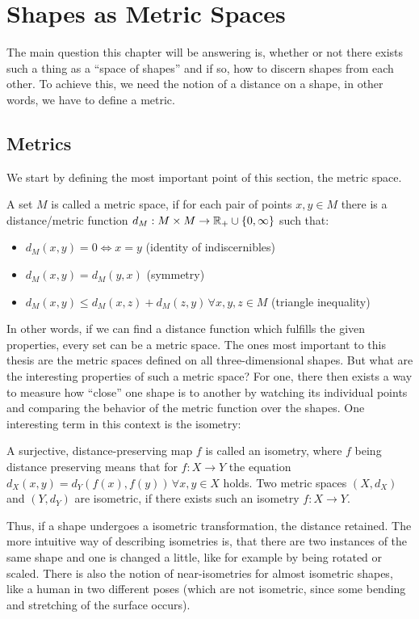 \chapter{Shapes as Metric Spaces}
\label{chapter:shapeSpaces}
The main question this chapter will be answering is, whether or not there exists such a thing as a ``space of shapes'' and if so, how to discern shapes from each other.
To achieve this, we need the notion of a distance on a shape, in other words, we have to define a metric.

\section{Metrics}
We start by defining the most important point of this section, the metric space.
\begin{mydef}
	A set $M$ is called a metric space, if for each pair of points $x,y \in M$ there is a distance/metric function $d_M: M \times M \rightarrow \mathbb{R}_+ \cup \{0,\infty\}$ such that:
	\begin{itemize}
		\item $d_M(x,y) = 0 \Leftrightarrow x = y$ (identity of indiscernibles)
		\item $d_M(x,y) = d_M(y,x)$ (symmetry)
		\item $d_M(x,y) \le d_M(x,z) + d_M(z,y)\,\forall x,y,z \in M$ (triangle inequality)
	\end{itemize}
\end{mydef}
In other words, if we can find a distance function which fulfills the given properties, every set can be a metric space.
The ones most important to this thesis are the metric spaces defined on all three-dimensional shapes.
But what are the interesting properties of such a metric space?
For one, there then exists a way to measure how ``close'' one shape is to another by watching its individual points and comparing the behavior of the metric function over the shapes.
One interesting term in this context is the isometry:
\begin{mydef}
	A surjective, distance-preserving map $f$ is called an isometry, where $f$ being distance preserving means that for $f :X \rightarrow Y$ the equation $d_X(x,y) = d_Y(f(x),f(y)) \,\forall x,y \in X$ holds.
	Two metric spaces $(X,d_X)$ and $(Y,d_Y)$ are isometric, if there exists such an isometry $f :X \rightarrow Y$.
\end{mydef}
Thus, if a shape undergoes a isometric transformation, the distance retained.
The more intuitive way of describing isometries is, that there are two instances of the same shape and one is changed a little, like for example by being rotated or scaled.
There is also the notion of near-isometries for almost isometric shapes, like a human in two different poses (which are not isometric, since some bending and stretching of the surface occurs).

